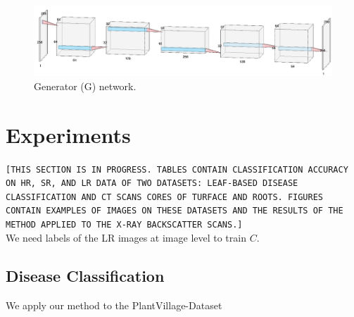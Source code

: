 \documentclass[10pt,twocolumn,letterpaper]{article}
\begin{document}
\begin{figure}[h]
\begin{center}
\includegraphics[scale=0.30]{G_net.png}
\end{center}
\label{fig:G_net}
\caption{Generator (G) network.}
\end{figure}


\section{Experiments}

\texttt{[THIS SECTION IS IN PROGRESS.  TABLES CONTAIN CLASSIFICATION ACCURACY ON HR, SR, AND LR DATA OF TWO DATASETS: LEAF-BASED DISEASE CLASSIFICATION AND CT SCANS CORES OF TURFACE AND ROOTS. FIGURES CONTAIN EXAMPLES OF IMAGES ON THESE DATASETS AND THE RESULTS OF THE METHOD APPLIED TO THE X-RAY BACKSCATTER SCANS.]}\\

We need labels of the LR images at image level to train $C$.

\subsection{Disease Classification}

We apply our method to the PlantVillage-Dataset \cite{Mohanty2016} %
\end{document}
